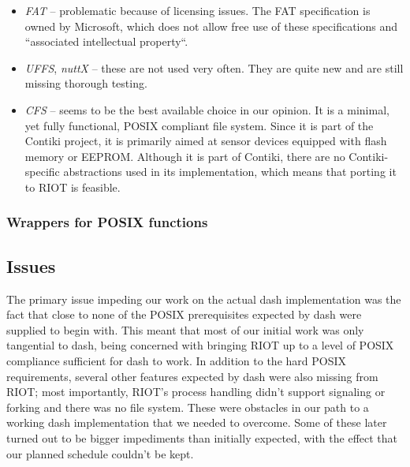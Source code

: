 \documentclass[conference]{IEEEtran}
\begin{document}
\begin{itemize}
  \item \emph{FAT}\cite{fat} -- problematic because of licensing issues. The FAT
    specification is owned by Microsoft, which does not allow free use
    of these specifications and ``associated intellectual
    property``\cite{fatlicense}.
  \item \emph{UFFS}\cite{uffs}, \emph{nuttX}\cite{nuttx} -- these are
    not used very often. They are quite new and are still missing
    thorough testing.
  \item \emph{CFS}\cite{cfs} -- seems to be the best available choice in
    our opinion. It is a minimal, yet fully functional, POSIX compliant
    file system. Since it is part of the Contiki project\cite{contiki},
    it is primarily aimed at sensor devices equipped with flash memory
    or EEPROM. Although it is part of Contiki, there are no
    Contiki-specific abstractions used in its implementation, which
    means that porting it to RIOT is feasible.
\end{itemize}

\subsubsection{Wrappers for POSIX functions}
\label{ssub:Wrappers for POSIX functions}

\subsection{Issues}
\label{sub:Issues}
The primary issue impeding our work on the actual dash implementation
was the fact that close to none of the POSIX prerequisites expected by
dash were supplied to begin with. This meant that most of our initial
work was only tangential to dash, being concerned with bringing RIOT up
to a level of POSIX compliance sufficient for dash to work. In addition
to the hard POSIX requirements, several other features expected by dash
were also missing from RIOT; most importantly, RIOT's process handling
didn't support signaling or forking and there was no file system. These
were obstacles in our path to a working dash implementation that we
needed to overcome. Some of these later turned out to be bigger
impediments than initially expected, with the effect that our planned
schedule couldn't be kept.
\end{document}
